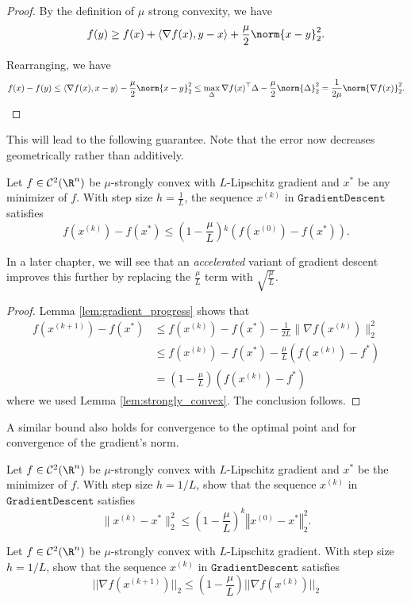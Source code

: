 \begin{proof}
By the definition of $\mu$ strong convexity, we have 
\[
f(y)\ge f(x)+\langle\nabla f(x),y-x\rangle+\frac{\mu}{2}\norm{x-y}_{2}^{2}.
\]

Rearranging, we have 
\[
f(x)-f(y)\le\langle\nabla f(x),x-y\rangle-\frac{\mu}{2}\norm{x-y}_{2}^{2}\le\max_{\Delta}\nabla f(x)^{\top}\Delta-\frac{\mu}{2}\norm{\Delta}_{2}^{2}=\frac{1}{2\mu}\norm{\nabla f(x)}_{2}^{2}.
\]
\end{proof}
This will lead to the following guarantee. Note that the error now
decreases geometrically rather than additively.
\begin{thm}
\label{thm:gd_convex_strongly}Let $f\in\mathcal{C}^{2}(\R^{n})$
be $\mu$-strongly convex with $L$-Lipschitz gradient and $x^{*}$
be any minimizer of $f$. With step size $h=\frac{1}{L}$, the sequence
$x^{(k)}$ in $\mathtt{GradientDescent}$ satisfies
\[
f(x^{(k)})-f(x^{*})\leq\left(1-\frac{\mu}{L}\right){}^{k}\left(f(x^{(0)})-f(x^{*})\right).
\]
\end{thm}

In a later chapter, we will see that an \emph{accelerated }variant
of gradient descent improves this further by replacing the $\frac{\mu}{L}$
term with $\sqrt{\frac{\mu}{L}}$.
\begin{proof}
Lemma \ref{lem:gradient_progress} shows that
\begin{align}
f(x^{(k+1)})-f(x^{*}) & \leq f(x^{(k)})-f(x^{*})-\frac{1}{2L}\|\nabla f(x^{(k)})\|_{2}^{2}\label{eq:strong_convex_progress}\\
 & \le f(x^{(k)})-f(x^{*})-\frac{\mu}{L}\left(f(x^{(k)})-f^{*}\right)\\
 & =\left(1-\frac{\mu}{L}\right)\left(f(x^{(k)})-f^{*}\right)
\end{align}
where we used Lemma \ref{lem:strongly_convex}. The conclusion follows.
\end{proof}
A similar bound also holds for convergence to the optimal point and
for convergence of the gradient's norm. 
\begin{xca}
Let $f\in\mathcal{C}^{2}(\R^{n})$ be $\mu$-strongly convex with
$L$-Lipschitz gradient and $x^{*}$ be the minimizer of $f$. With
step size $h=1/L$, show that the sequence $x^{(k)}$ in $\mathtt{GradientDescent}$
satisfies 
\[
\|x^{(k)}-x^{*}\|_{2}^{2}\le\left(1-\frac{\mu}{L}\right)^{k}\left\Vert x^{(0)}-x^{*}\right\Vert _{2}^{2}.
\]
\end{xca}

\begin{xca}
Let $f\in\mathcal{C}^{2}(\R^{n})$ be $\mu$-strongly convex with
$L$-Lipschitz gradient. With step size $h=1/L$, show that the sequence
$x^{(k)}$ in $\mathtt{GradientDescent}$ satisfies
\[
||\nabla f(x^{(k+1)})||_{2}\leq\left(1-\frac{\mu}{L}\right)||\nabla f(x^{(k)})||_{2}
\]
\end{xca}

